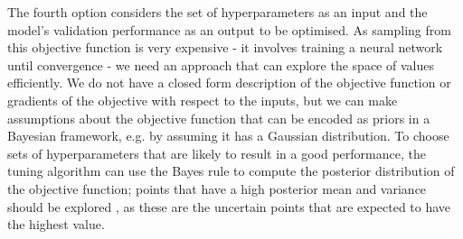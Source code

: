 The fourth option considers the set of hyperparameters as an input and the model's validation performance as an output to be optimised.
As sampling from this objective function is very expensive - it involves training a neural network until convergence - we need an approach that can explore the space of values efficiently.
We do not have a closed form description of the objective function or gradients of the objective with respect to the inputs, but we can make assumptions about the objective function that can be encoded as priors in a Bayesian framework, e.g. by assuming it has a Gaussian distribution.
To choose sets of hyperparameters that are likely to result in a good performance, the tuning algorithm can use the Bayes rule to compute the posterior distribution of the objective function; points that have a high posterior mean and variance should be explored \cite{bayesian}, as these are the uncertain points that are expected to have the highest value.
